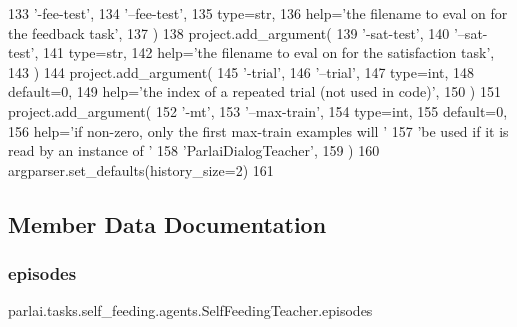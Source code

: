 \begin{DoxyCode}
133             \textcolor{stringliteral}{'-fee-test'},
134             \textcolor{stringliteral}{'--fee-test'},
135             type=str,
136             help=\textcolor{stringliteral}{'the filename to eval on for the feedback task'},
137         )
138         project.add\_argument(
139             \textcolor{stringliteral}{'-sat-test'},
140             \textcolor{stringliteral}{'--sat-test'},
141             type=str,
142             help=\textcolor{stringliteral}{'the filename to eval on for the satisfaction task'},
143         )
144         project.add\_argument(
145             \textcolor{stringliteral}{'-trial'},
146             \textcolor{stringliteral}{'--trial'},
147             type=int,
148             default=0,
149             help=\textcolor{stringliteral}{'the index of a repeated trial (not used in code)'},
150         )
151         project.add\_argument(
152             \textcolor{stringliteral}{'-mt'},
153             \textcolor{stringliteral}{'--max-train'},
154             type=int,
155             default=0,
156             help=\textcolor{stringliteral}{'if non-zero, only the first max-train examples will '}
157             \textcolor{stringliteral}{'be used if it is read by an instance of '}
158             \textcolor{stringliteral}{'ParlaiDialogTeacher'},
159         )
160         argparser.set\_defaults(history\_size=2)
161 
\end{DoxyCode}


\subsection{Member Data Documentation}
\mbox{\label{classparlai_1_1tasks_1_1self__feeding_1_1agents_1_1SelfFeedingTeacher_a63dea9aaa22e209cc87ef89a58e1b47f}} 
\subsubsection{\texorpdfstring{episodes}{episodes}}
{\footnotesize\ttfamily parlai.\+tasks.\+self\+\_\+feeding.\+agents.\+Self\+Feeding\+Teacher.\+episodes}



